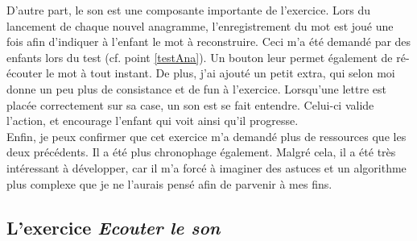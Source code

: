 D'autre part, le son est une composante importante de l'exercice. Lors du lancement de chaque nouvel anagramme, l'enregistrement du mot est joué une fois afin d'indiquer à l'enfant le mot à reconstruire. Ceci m'a été demandé par des enfants lors du test (cf. point \ref{testAna}). Un bouton leur permet également de ré-écouter le mot à tout instant. De plus, j'ai ajouté un petit extra, qui selon moi donne un peu plus de consistance et de fun à l'exercice. Lorsqu'une lettre est placée correctement sur sa case, un son est se fait entendre. Celui-ci valide l'action, et encourage l'enfant qui voit ainsi qu'il progresse.\\

Enfin, je peux confirmer que cet exercice m'a demandé plus de ressources que les deux précédents. Il a été plus chronophage également. Malgré cela, il a été très intéressant à développer, car il m'a forcé à imaginer des astuces et un algorithme plus complexe que je ne l'aurais pensé afin de parvenir à mes fins.

\subsection{L'exercice \textit{Ecouter le son}}
